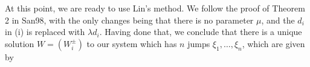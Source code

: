 \documentclass[12pt]{article}
\def\R{{\mathbb R}}
\begin{document}






At this point, we are ready to use Lin's method. We follow the proof of Theorem 2 in San98, with the only changes being that there is no parameter $\mu$, and the $d_i$ in (i) is replaced with $\lambda d_i$. Having done that, we conclude that there is a unique solution $W = (W_i^\pm)$ to our system which has $n$ jumps $\xi_1, \dots, \xi_n$, which are given by
\end{document}

